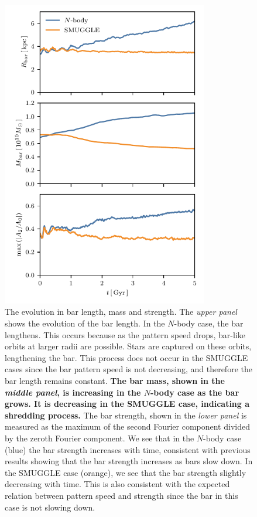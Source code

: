 \documentclass[twocolumn,linenumbers,trackchanges]{aastex631}
\newcommand{\Nbody}{$N$-body}
\newcommand{\SMUGGLE}{SMUGGLE}
\begin{document}
\begin{figure}
    \centering
    \includegraphics[width=9cm]{fig/Rb_A2.pdf}
    \caption{The evolution in bar length, mass and strength. The \textit{upper panel}
    shows the evolution of the bar length. In the \Nbody{} case, the bar
    lengthens. This occurs because as the pattern speed drops, bar-like orbits
    at larger radii are possible. Stars are captured on these orbits,
    lengthening the bar. This process does not occur in the \SMUGGLE{} cases
    since the bar pattern speed is not decreasing, and therefore the bar length
    remains constant. {\bf The bar mass, shown in the \textit{middle panel}, is
    increasing in the \Nbody{} case as the bar grows. It is decreasing in the
    \SMUGGLE{} case, indicating a shredding process.} The bar strength, shown in
    the \textit{lower panel} is measured as the maximum of the second Fourier
    component divided by the zeroth Fourier component. We see that in the
    \Nbody{} case (blue) the bar strength increases with time, consistent with
    previous results showing that the bar strength increases as bars slow down.
    In the \SMUGGLE{} case (orange), we see that the bar strength slightly
    decreasing with time. This is also consistent with the expected relation
    between pattern speed and strength since the bar in this case is not slowing
    down.}
    \label{fig:strength}
\end{figure}
\end{document}
